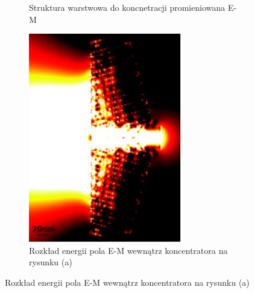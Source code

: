\begin{figure}[!htb]
\begin{subfigure}[b]{.45\textwidth}
		\caption{Struktura warstwowa do koncnetracji promieniowana E-M}
		\label{fig:old-concen-eps}
	\end{subfigure}
	\begin{subfigure}[b]{.45\textwidth}
		\includegraphics[angle=90,width=\textwidth]{images/multilayer/konc_ene_mgr.png}
		\caption{Rozkład energii pola E-M wewnątrz koncentratora na rysunku (a)}
		\label{fig:old-concen-pow}
	\end{subfigure}


\end{figure}
